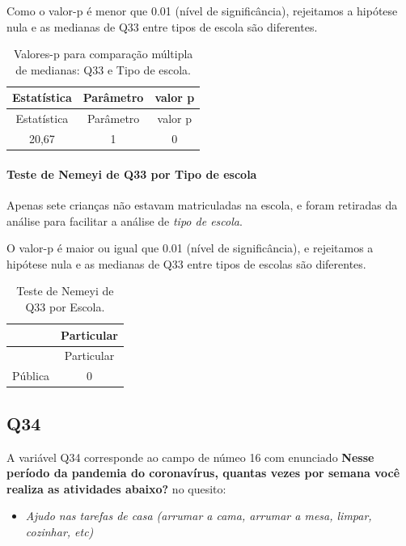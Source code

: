 \documentclass[]{article}
\providecommand{\tightlist}{%
  \setlength{\itemsep}{0pt}\setlength{\parskip}{0pt}}
\let\oldparagraph\paragraph
\renewcommand{\paragraph}[1]{\oldparagraph{#1}\mbox{}}
\begin{document}
Como o valor-p é menor que 0.01 (nível de significância), rejeitamos a hipótese nula e as medianas de Q33 entre tipos de escola são diferentes.

\begin{longtable}[]{@{}ccc@{}}
\caption{\label{tab:unnamed-chunk-1181}Valores-p para comparação múltipla de medianas: Q33 e Tipo de escola.}\tabularnewline
\toprule
Estatística & Parâmetro & valor p\tabularnewline
\midrule
\endfirsthead
\toprule
Estatística & Parâmetro & valor p\tabularnewline
\midrule
\endhead
20,67 & 1 & 0\tabularnewline
\bottomrule
\end{longtable}

\hypertarget{teste-de-nemeyi-de-q33-por-tipo-de-escola}{%
\paragraph{Teste de Nemeyi de Q33 por Tipo de escola}\label{teste-de-nemeyi-de-q33-por-tipo-de-escola}}

Apenas sete crianças não estavam matriculadas na escola, e foram retiradas da análise para facilitar a análise de \emph{tipo de escola}.

O valor-p é maior ou igual que 0.01 (nível de significância), e rejeitamos a hipótese nula e as medianas de Q33 entre tipos de escolas são diferentes.

\begin{longtable}[]{@{}lc@{}}
\caption{\label{tab:unnamed-chunk-1183}Teste de Nemeyi de Q33 por Escola.}\tabularnewline
\toprule
& Particular\tabularnewline
\midrule
\endfirsthead
\toprule
& Particular\tabularnewline
\midrule
\endhead
Pública & 0\tabularnewline
\bottomrule
\end{longtable}

\cleardoublepage

\hypertarget{q34}{%
\subsection{Q34}\label{q34}}

A variável Q34 corresponde ao campo de númeo 16 com enunciado \textbf{Nesse período da pandemia do coronavírus, quantas vezes por semana você realiza as atividades abaixo?} no quesito:

\begin{itemize}
\tightlist
\item
  \emph{Ajudo nas tarefas de casa (arrumar a cama, arrumar a mesa, limpar, cozinhar, etc)}
\end{itemize}
\end{document}
